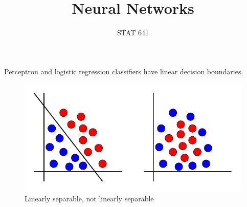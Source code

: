 \documentclass{beamer}
\begin{document}
    
\setlength{\parskip}{1em}
\begin{frame}
    \title{Neural Networks}
    \date{STAT 641}
    \maketitle
\end{frame}

\begin{frame}{}
    Perceptron and logistic regression classifiers have linear decision boundaries.
    \begin{figure}
    \includegraphics[]{linear/linear.pdf}
    \caption{Linearly separable, not linearly separable}
    \end{figure}
\end{frame}
\end{document}
